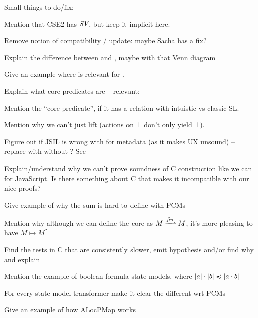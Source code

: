 Small things to do/fix: \begin{compactitem}
 \item \sout{Mention that CSE2 has $\textit{SV}$, but keep it implicit here.}
 \item Remove notion of compatibility / update: maybe Sacha has a fix?
 \item Explain the difference between \LFail{} and \Err{}, maybe with that Venn diagram
 \item Give an example where \Miss{} is relevant for \consume.
 \item Explain what core predicates are -- relevant: \cite{abstractseplogic}
 \item Mention the  ``core predicate'', if it has a relation with intuistic vs classic SL.
 \item Mention why we can't just lift \execac{} (actions on $\bot$ don't only yield $\bot$).
 \item Figure out if JSIL is wrong with \Ag{} for metadata (as it makes  UX unsound) -- replace with \Frac{} without \store{}? See \cite{towardsjs}
 \item Explain/understand why we can't prove soundness of C construction like we can for JavaScript. Is there something about C that makes it incompatible with our nice proofs?
 \item Give example of why the sum is hard to define with PCMs
 \item Mention why although we can define the core as $M\finmap M$, it's more pleasing to have $M\mapsto M^?$
 \item Find the tests in C that are consistently slower, emit hypothesis and/or find why and explain
 \item Mention the example of boolean formula state models, where $|a| \cdot |b| \preccurlyeq |a\cdot b|$
 \item For every state model transformer make it clear the different wrt PCMs
 \item Give an example of how ALocPMap works
 \end{compactitem}
